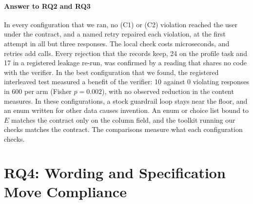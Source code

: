\documentclass[smallextended,natbib]{svjour3}
\begin{document}
\paragraph{Answer to RQ2 and RQ3}
In every configuration that we ran, no (C1) or (C2) violation reached the user
under the contract, and a named retry repaired each violation, at the first
attempt in all but three responses. The local check costs microseconds, and
retries add calls. Every rejection that the records keep, 24 on the profile
task and 17 in a registered leakage re-run, was confirmed by a reading that
shares no code with the verifier. In the best configuration that we found, the
registered interleaved test measured a benefit of the verifier: 10 against 0
violating responses in 600 per arm (Fisher $p=0.002$), with no observed
reduction in the content measures. In these configurations, a
stock guardrail loop stays near the floor, and an enum written for other data
causes invention. An enum or choice list bound to $E$ matches the contract
only on the column field, and the toolkit running our checks matches the
contract. The comparisons measure what each configuration checks.

\section{RQ4: Wording and Specification Move Compliance}\label{sec:rq4}
\end{document}
